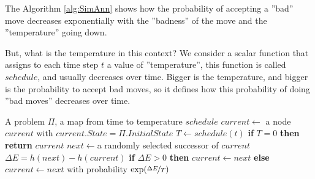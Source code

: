 \documentclass[10pt, letterpaper]{report}
\begin{document}
The Algorithm \ref{alg:SimAnn} shows how the probability of accepting a ''bad'' move decreases exponentially with the ''badness'' of the move and the ''temperature'' going down.

But, what is the temperature in this context? We consider a scalar function that assigns to each time step $t$ a value of ''temperature'', this function is called $schedule$, and usually decreases over time. Bigger is the temperature, and bigger is the probability to accept bad moves, so it defines how this probability of doing ''bad moves'' decreases over time.

\begin{algorithm}
    \caption{Simulated-Annealing}\label{alg:SimAnn}
    \begin{algorithmic}
    \Require A problem $\Pi$, a map from time to temperature $schedule$
    \State $current\leftarrow$ a node $current$ with $current.State=\Pi.InitialState$
    \State $T\leftarrow schedule(t)$
    \State \textbf{if} $T=0$ \textbf{then return} $current$
    \State $next\leftarrow $a randomly selected successor of $current$
    \State $\Delta E=h(next)-h(current)$
    \State \textbf{if} $\Delta E>0$ \textbf{then} $current\leftarrow next$
    \State\textbf{else} $current\leftarrow next$ with probability $\exp(\nicefrac{\Delta E}{T})$
    \EndFor
    \end{algorithmic}
\end{algorithm}
\end{document}
